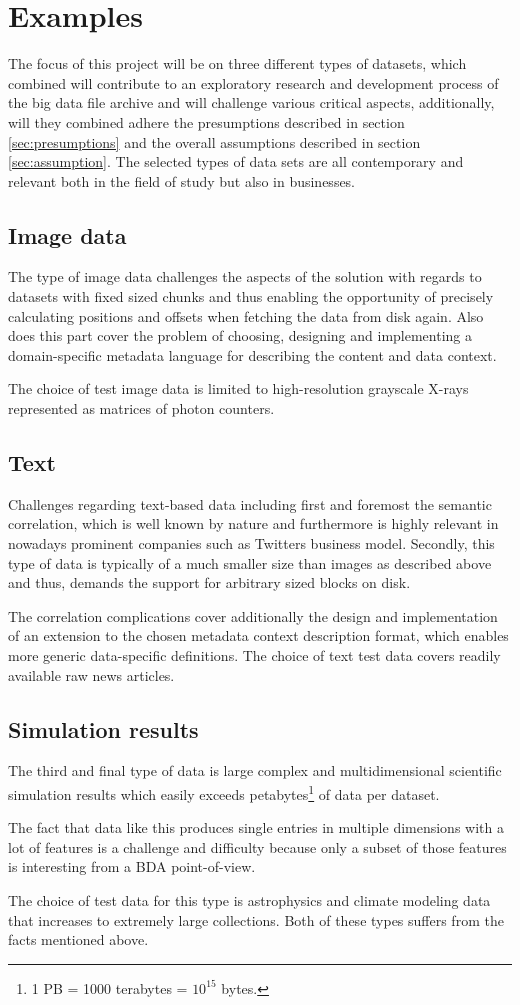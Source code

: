 \section{Examples}
The focus of this project will be on three different types of datasets, which combined will contribute to an exploratory research and development process of the big data file archive and will challenge various critical aspects, additionally, will they combined adhere the presumptions described in section \ref{sec:presumptions} and the overall assumptions described in section \ref{sec:assumption}. The selected types of data sets are all contemporary and relevant both in the field of study but also in businesses.

\subsection*{Image data}
The type of image data challenges the aspects of the solution with regards to datasets with fixed sized chunks and thus enabling the opportunity of precisely calculating positions and offsets when fetching the data from disk again. Also does this part cover the problem of choosing, designing and implementing a domain-specific metadata language for describing the content and data context. 

The choice of test image data is limited to high-resolution grayscale X-rays represented as matrices of photon counters.

\subsection*{Text}
Challenges regarding text-based data including first and foremost the semantic correlation, which is well known by nature and furthermore is highly relevant in nowadays prominent companies such as Twitters business model. Secondly, this type of data is typically of a much smaller size than \eg images as described above and thus, demands the support for arbitrary sized blocks on disk. 
\newline

The correlation complications cover additionally the design and implementation of an extension to the chosen metadata context description format, which enables more generic data-specific definitions. The choice of text test data covers \eg readily available raw news articles.

\subsection*{Simulation results}
The third and final type of data is large complex and multidimensional scientific simulation results which easily exceeds petabytes\footnote{1 PB =  1000 terabytes = $10^{15}$ bytes.} of data per dataset. 

The fact that data like this produces single entries in multiple dimensions with a lot of features is a challenge and difficulty because only a subset of those features is interesting from a BDA point-of-view.

The choice of test data for this type is astrophysics and climate modeling data that increases to extremely large collections. Both of these types suffers from the facts mentioned above.